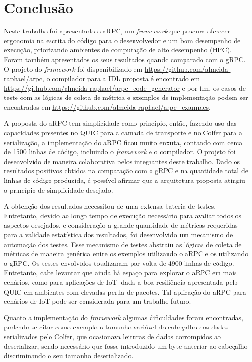 \chapter{Conclusão}

Neste trabalho foi apresentado o aRPC, um \textit{framework} que procura oferecer ergonomia na escrita do código para o desenvolvedor e um bom desempenho de execução, priorizando ambientes de computação de alto desempenho (HPC). Foram também apresentados os seus resultados quando comparado com o gRPC. O projeto do \textit{framework} foi disponibilizado em \url{https://github.com/almeida-raphael/arpc}, o compilador para a IDL proposta é encontrado em \url{https://github.com/almeida-raphael/arpc_code_generator} e por fim, os casos de teste com as lógicas de coleta de métrica e exemplos de implementação podem ser encontrados em \url{https://github.com/almeida-raphael/arpc_examples}.

A proposta do aRPC tem simplicidade como princípio, então, fazendo uso das capacidades presentes no QUIC para a camada de transporte e no Colfer para a serialização, a implementação do aRPC ficou muito enxuta, contando com cerca de 1500 linhas de código, incluindo o \textit{framework} e o compilador. O projeto foi desenvolvido de maneira colaborativa pelos integrantes deste trabalho. Dado os resultados positivos obtidos na comparação com o gRPC e na quantidade total de linhas de código produzida, é possível afirmar que a arquitetura proposta atingiu o princípio de simplicidade desejado.

A obtenção dos resultados necessitou de uma extensa bateria de testes. Entretanto, devido ao longo tempo de execução necessário para avaliar todos os aspectos desejados, e consideração a grande quantidade de métricas requeridas para a validade estatística dos resultados, foi desenvolvido um mecanismo de automação dos testes. Esse mecanismo de testes abstraiu as lógicas de coleta de métricas de maneira genérica entre os exemplos utilizando o aRPC e os utilizando o gRPC. Os testes envolvidos totalizaram por volta de 4900 linhas de código. Entretanto, cabe levantar que ainda há espaço para explorar o aRPC em mais cenários, como para aplicações de IoT, dada a boa resiliência apresentada pelo QUIC em ambientes com elevadas perda de pacotes. Tal aplicação do aRPC para cenários de IoT pode ser considerada para um trabalho futuro.

Quanto a implementação do \textit{framework} algumas dificuldades foram encontradas, podendo-se citar como exemplo o tamanho variável do cabeçalho dos dados serializados pelo Colfer, que ocasionava leituras de dados corrompidos ao deserializar, sendo necessário que fosse introduzido um byte anterior ao cabeçalho discriminando o seu tamanho deserializado.

